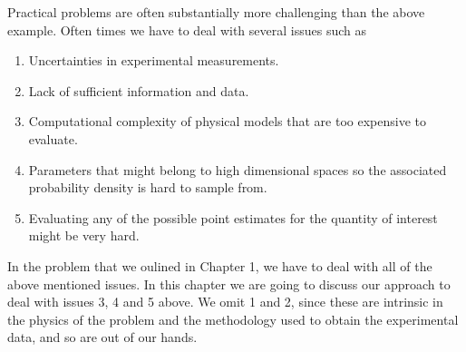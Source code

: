 \documentclass[12pt]{book}
\begin{document}
Practical problems are often substantially more challenging than the above example. Often times we have to 
deal with several issues such as 

\begin{enumerate}
\item Uncertainties in experimental measurements.
\item Lack of sufficient information and data.
\item Computational complexity of  physical models that are too expensive to evaluate.
\item Parameters that might belong to high dimensional spaces so the associated probability density is 
hard to sample from.
\item Evaluating any of the possible point estimates for the quantity of interest might be very hard.
\end{enumerate}
In the problem that we oulined in  Chapter 1, we have to deal with all of  the above mentioned issues.
In this chapter we are going to discuss our approach to deal with issues 3, 4 and 5 above. We 
omit 1 and 2, since these  are intrinsic in the physics of the problem and   the methodology used 
to obtain the experimental data, and so are out of our hands.


\end{document}
